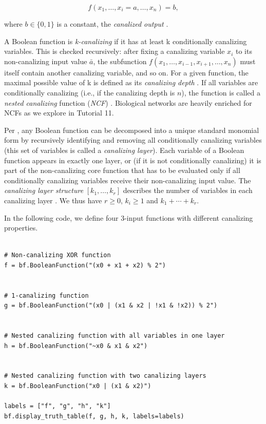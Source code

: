 \documentclass[
]{article}
\begin{document}
\[
f(x_1,\ldots,x_i=a,\ldots,x_n)=b,
\]

where \(b \in \{0,1\}\) is a constant, the \emph{canalized output}
\citep{kauffman1974large}.

A Boolean function is \emph{k-canalizing} if it has at least k
conditionally canalizing variables. This is checked recursively: after
fixing a canalizing variable \(x_i\) to its non-canalizing input value
\(\bar a\), the subfunction \(f(x_1,\ldots,x_{i-1},x_{i+1},\ldots,x_n)\)
must itself contain another canalizing variable, and so on. For a given
function, the maximal possible value of k is defined as its
\emph{canalizing depth} \citep{layne2012nested}. If all variables are
conditionally canalizing (i.e., if the canalizing depth is \(n\)), the
function is called a \emph{nested canalizing} function (\emph{NCF})
\citep{he2016stratification}. Biological networks are heavily enriched
for NCFs as we explore in Tutorial 11.

Per \citet{he2016stratification}, any Boolean function can be decomposed
into a unique standard monomial form by recursively identifying and
removing all conditionally canalizing variables (this set of variables
is called a \emph{canalizing layer}). Each variable of a Boolean
function appears in exactly one layer, or (if it is not conditionally
canalizing) it is part of the non-canalizing core function that has to
be evaluated only if all conditionally canalizing variables receive
their non-canalizing input value. The \emph{canalizing layer structure}
\([k_1,\ldots,k_r]\) describes the number of variables in each
canalizing layer \citep{dimitrova2022revealing}. We thus have
\(r\geq 0\), \(k_i\geq 1\) and \(k_1+\cdots+k_r\).

In the following code, we define four 3-input functions with different
canalizing properties.

\begin{lstlisting}

# Non-canalizing XOR function
f = bf.BooleanFunction("(x0 + x1 + x2) % 2")


# 1-canalizing function
g = bf.BooleanFunction("(x0 | (x1 & x2 | !x1 & !x2)) % 2")


# Nested canalizing function with all variables in one layer
h = bf.BooleanFunction("~x0 & x1 & x2")


# Nested canalizing function with two canalizing layers
k = bf.BooleanFunction("x0 | (x1 & x2)")

labels = ["f", "g", "h", "k"]
bf.display_truth_table(f, g, h, k, labels=labels)
\end{lstlisting}
\end{document}

